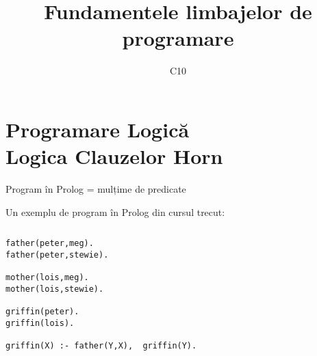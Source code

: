 \documentclass[xcolor=pdftex,romanian,colorlinks]{beamer}
\title[FLP]{Fundamentele limbajelor de programare}
\subtitle{C10}
\date{}
\begin{document}
\begin{frame}
  \titlepage
\end{frame}

\setlength{\leftmargini}{12pt}




\section{\color{section-color}Programare Logică \\ Logica Clauzelor Horn}  

\begin{frame}[fragile]{Program  în Prolog = mulțime de predicate}

Un exemplu de \alert{program în Prolog} din cursul trecut:
 
\begin{columns}
\begin{column}{.5\textwidth}
\vspace{-.2cm}
\begin{verbatim}
father(peter,meg). 
father(peter,stewie).

mother(lois,meg). 
mother(lois,stewie).

griffin(peter).
griffin(lois).

griffin(X) :- father(Y,X),  griffin(Y).
\end{verbatim}
\end{column}
\begin{column}{.3\textwidth}
\\
\\
\\
\end{column}
\end{columns}

\end{frame}

\end{document}
